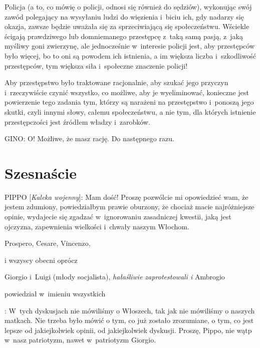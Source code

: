 \documentclass[oneside,polish,11pt,sfheadings]{mwbk}
\begin{document}
 
Policja (a to, co mówię o policji, odnosi się również do sędziów), wykonując swój zawód polegający na wysyłaniu ludzi do
więzienia i~biciu ich, gdy nadarzy się okazja, zawsze będzie uważała się za sprzeciwiającą się społeczeństwu. Wściekle
ścigają prawdziwego lub domniemanego przestępcę z~taką samą pasją, z~jaką myśliwy goni zwierzynę, ale jednocześnie w~interesie policji jest, aby przestępców było więcej, bo to oni są powodem ich istnienia, a im większa liczba i~szkodliwość przestępców, tym większa siła i~społeczne znaczenie policji! 

 
Aby przestępstwo było traktowane racjonalnie, aby szukać jego przyczyn i~rzeczywiście czynić wszystko, co możliwe, aby
je wyeliminować, konieczne jest powierzenie tego zadania tym, którzy są narażeni na przestępstwo i~ponoszą jego skutki,
czyli innymi słowy, całemu społeczeństwu, a nie tym, dla których istnienie przestępczości jest źródłem władzy i~zarobków. 




 
\noindent GINO: O! Możliwe, że masz rację. Do następnego razu. 










\chapter*{Szesnaście}



 
\noindent PIPPO [\textit{Kaleka wojenny}]: Mam dość! Proszę pozwólcie mi opowiedzieć wam, że jestem zdumiony, powiedziałbym
prawie oburzony, że chociaż macie najróżniejsze opinie, wydajecie się zgadzać w~ignorowaniu zasadniczej kwestii, jaką
jest ojczyzna, zapewnienia wielkości i~chwały naszym Włochom. 




 
Prospero, Cesare, Vincenzo, \begin{itshape}i wszyscy obecni oprócz  \end{itshape}Giorgio i~Luigi (młody socjalista), \textit{hałaśliwie zaprotestowali i} Ambrogio \begin{itshape} powiedział w~imieniu wszystkich \end{itshape}: W~tych dyskusjach nie mówiliśmy o Włoszech, tak jak nie mówiliśmy o
naszych matkach. Nie trzeba było mówić o tym, co już zostało zrozumiane, o tym, co jest lepsze od jakiejkolwiek opinii,
od jakiejkolwiek dyskusji. Proszę, Pippo, nie wątp w~nasz patriotyzm, nawet w~patriotyzm Giorgio. 
\end{document}

